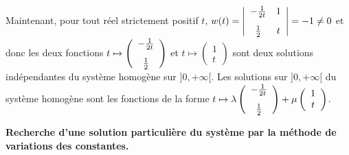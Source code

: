 {\begin{enumerate}
{Maintenant, pour tout réel strictement positif $t$, $w(t)=\left|
\begin{array}{cc}
- \frac{1}{2t}&1\\
\rule{0mm}{6mm} \frac{1}{2}&t
\end{array}
\right|=-1\neq0$ et donc les deux fonctions $t\mapsto\left(
\begin{array}{c}
- \frac{1}{2t}\\
\rule{0mm}{6mm} \frac{1}{2}
\end{array}
\right)$ et $t\mapsto\left(
\begin{array}{c}
1\\
t
\end{array}
\right)$ sont deux solutions indépendantes du système homogène sur $]0,+\infty[$. Les solutions sur $]0,+\infty[$ du système homogène sont les fonctions de la forme $t\mapsto\lambda\left(
\begin{array}{c}
- \frac{1}{2t}\\
\rule{0mm}{6mm} \frac{1}{2}
\end{array}
\right)
+\mu\left(
\begin{array}{c}
1\\
t
\end{array}
\right)$.

\textbf{Recherche d'une solution particulière du système par la méthode de variations des constantes.}

}
\end{enumerate}}
